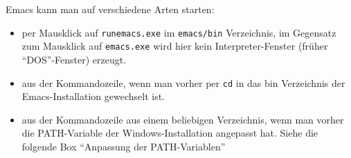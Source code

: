 \documentclass[12pt,ngerman]{scrbook}
\begin{document}
Emacs kann man auf verschiedene Arten starten:

\begin{itemize}
	\item per Mausklick auf \texttt{runemacs.exe} im \texttt{emacs/bin} Verzeichnis, im Gegensatz zum Mausklick auf \texttt{emacs.exe} wird hier kein Interpreter-Fenster (früher \enquote{DOS}-Fenster) erzeugt.
	\item aus der Kommandozeile, wenn man vorher per \texttt{cd} in das bin Verzeichnis der Emacs-Installation gewechselt ist. 
	\item aus der Kommandozeile aus einem beliebigen Verzeichnis, wenn man vorher die PATH-Variable der Windows-Installation angepasst hat. Siehe die folgende Box \enquote{Anpassung der PATH-Variablen}
\end{itemize}
\end{document}

